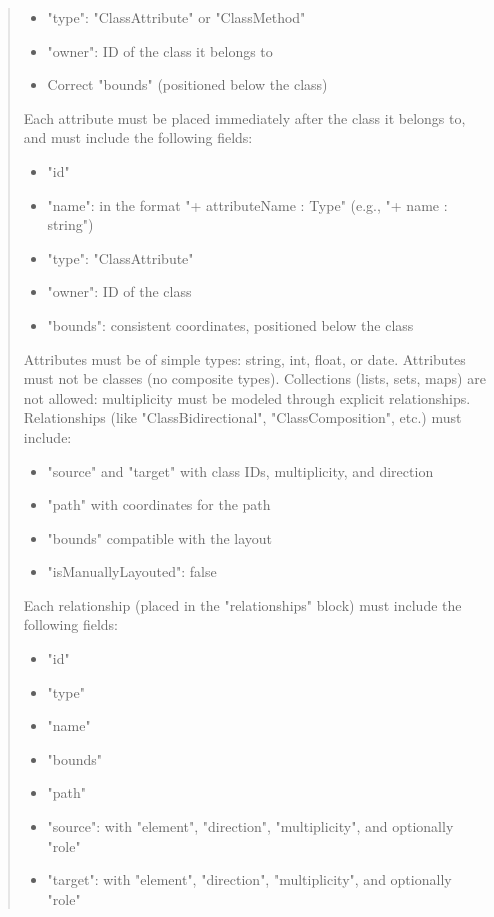 \begin{quote}
    \begin{itemize}
        \item "type": "ClassAttribute" or "ClassMethod"
        \item "owner": ID of the class it belongs to
        \item Correct "bounds" (positioned below the class)
    \end{itemize} 
    Each attribute must be placed immediately after the class it belongs to, and must include the following fields:
    \begin{itemize}
        \item "id"
        \item "name": in the format "+ attributeName : Type" (e.g., "+ name : string")
        \item "type": "ClassAttribute"
        \item "owner": ID of the class
        \item "bounds": consistent coordinates, positioned below the class
    \end{itemize}
    Attributes must be of simple types: string, int, float, or date. Attributes must not be classes (no composite types). Collections (lists, sets, maps) are not allowed: multiplicity must be modeled through explicit relationships.\\
    Relationships (like "ClassBidirectional", "ClassComposition", etc.) must include:
    \begin{itemize}
        \item "source" and "target" with class IDs, multiplicity, and direction
        \item "path" with coordinates for the path
        \item "bounds" compatible with the layout
        \item "isManuallyLayouted": false
    \end{itemize}
    Each relationship (placed in the "relationships" block) must include the following fields:
    \begin{itemize}
        \item "id"
        \item "type"
        \item "name"
        \item "bounds"
        \item "path"
        \item "source": with "element", "direction", "multiplicity", and optionally "role"
        \item "target": with "element", "direction", "multiplicity", and optionally "role"

\end{itemize}
\end{quote}
